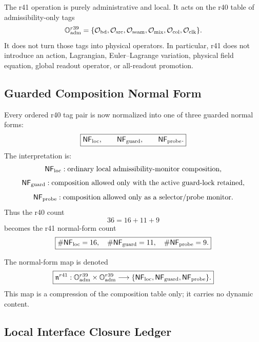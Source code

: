 The r41 operation is purely administrative and local.  It acts on the r40 table
of admissibility-only tags
\[
\mathbb O_{\rm adm}^{r39}
=
\{\mathcal O_{\rm bd},\mathcal O_{\rm src},\mathcal O_{\rm seam},
\mathcal O_{\rm mix},\mathcal O_{\rm col},\mathcal O_{\rm clk}\}.
\]
It does not turn those tags into physical operators.  In particular, r41 does
not introduce an action, Lagrangian, Euler--Lagrange variation, physical field
equation, global readout operator, or all-readout promotion.

\subsection{Guarded Composition Normal Form}
\label{subsec:r41-guarded-composition-normal-form}

Every ordered r40 tag pair is now normalized into one of three guarded normal
forms:
\[
\boxed{
\mathsf{NF}_{\rm loc},\qquad
\mathsf{NF}_{\rm guard},\qquad
\mathsf{NF}_{\rm probe}.
}
\]
The interpretation is:
\[
\mathsf{NF}_{\rm loc}:
\hbox{ordinary local admissibility-monitor composition},
\]
\[
\mathsf{NF}_{\rm guard}:
\hbox{composition allowed only with the active guard-lock retained},
\]
\[
\mathsf{NF}_{\rm probe}:
\hbox{composition allowed only as a selector/probe monitor.}
\]
Thus the r40 count
\[
36=16+11+9
\]
becomes the r41 normal-form count
\[
\boxed{
\#\mathsf{NF}_{\rm loc}=16,
\quad
\#\mathsf{NF}_{\rm guard}=11,
\quad
\#\mathsf{NF}_{\rm probe}=9.
}
\]

The normal-form map is denoted
\[
\boxed{
\mathfrak n^{r41}:
\mathbb O_{\rm adm}^{r39}\times\mathbb O_{\rm adm}^{r39}
\longrightarrow
\{\mathsf{NF}_{\rm loc},\mathsf{NF}_{\rm guard},\mathsf{NF}_{\rm probe}\}.
}
\]
This map is a compression of the composition table only; it carries no dynamic
content.

\subsection{Local Interface Closure Ledger}
\label{subsec:r41-local-interface-closure-ledger}


